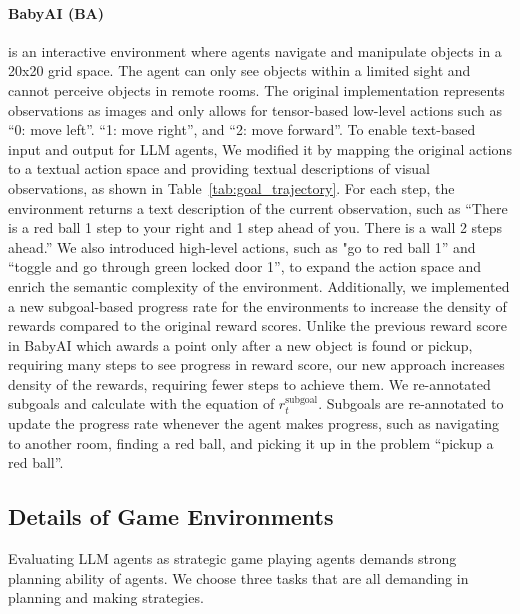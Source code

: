\paragraph{BabyAI (BA)~\citep{chevalier2018babyai}}
is an interactive environment where agents navigate and manipulate objects in a 20x20 grid space. 
The agent can only see objects within a limited sight and cannot perceive objects in remote rooms. 
The original implementation represents observations as images and only allows for tensor-based low-level actions such as “0: move left”.
“1: move right”, and “2: move forward”. 
To enable text-based input and output for LLM agents, 
We modified it by mapping the original actions to a textual action space and providing textual descriptions of visual observations, as shown in Table~\ref{tab:goal_trajectory}. 
For each step, the environment returns a text description of the current observation, such as “There is a red ball 1 step to your right and 1 step ahead of you. There is a wall 2 steps ahead.” We also introduced high-level actions, such as "go to red ball 1” and “toggle and go through green locked door 1”, to expand the action space and enrich the semantic complexity of the environment. 
Additionally, we implemented a new subgoal-based progress rate for the environments to increase the density of rewards compared to the original reward scores.
Unlike the previous reward score in BabyAI which awards a point only after a new object is found or pickup, requiring many steps to see progress in reward score, our new approach increases density of the rewards, requiring fewer steps to achieve them. 
We re-annotated subgoals and calculate with the equation of $r_{t}^{\text{subgoal}}$. 
Subgoals are re-annotated to update the progress rate whenever the agent makes progress, such as navigating to another room, finding a red ball, and picking it up in the problem “pickup a red ball”.


 

\subsection{Details of Game Environments}
Evaluating LLM agents as strategic game playing agents demands strong planning ability of agents. We choose three tasks that are all demanding in planning and making strategies. 

